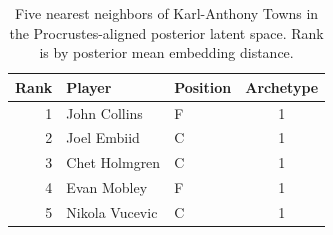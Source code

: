 \begin{table}[htbp]
  \centering\small
  \begin{tabular}{rllc}
    \toprule
    Rank & Player & Position & Archetype \\
    \midrule
    1 & John Collins & F & 1 \\
    2 & Joel Embiid & C & 1 \\
    3 & Chet Holmgren & C & 1 \\
    4 & Evan Mobley & F & 1 \\
    5 & Nikola Vucevic & C & 1 \\
    \bottomrule
  \end{tabular}
  \caption{Five nearest neighbors of Karl-Anthony Towns in the Procrustes-aligned posterior latent space. Rank is by posterior mean embedding distance.}
  \label{tab:Karl_Anthony_Towns_neighbors}
\end{table}

